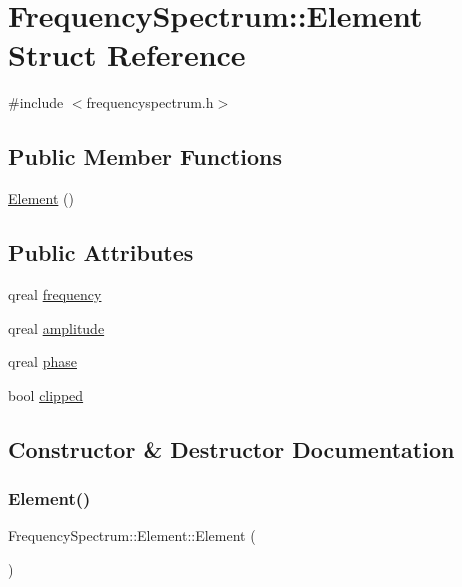 \hypertarget{struct_frequency_spectrum_1_1_element}{}\section{Frequency\+Spectrum\+:\+:Element Struct Reference}
\label{struct_frequency_spectrum_1_1_element}


{\ttfamily \#include $<$frequencyspectrum.\+h$>$}

\subsection*{Public Member Functions}
\begin{DoxyCompactItemize}
\item 
\hyperlink{struct_frequency_spectrum_1_1_element_a60e974e83dfd98518339e2681d8cdcdc}{Element} ()
\end{DoxyCompactItemize}
\subsection*{Public Attributes}
\begin{DoxyCompactItemize}
\item 
qreal \hyperlink{struct_frequency_spectrum_1_1_element_af6fb6c8a356fc27881bca9af0b89d88f}{frequency}
\item 
qreal \hyperlink{struct_frequency_spectrum_1_1_element_a057906284c20696169f327cae2f9ca80}{amplitude}
\item 
qreal \hyperlink{struct_frequency_spectrum_1_1_element_aea3fc976c7f3ba3d916d8017d847b011}{phase}
\item 
bool \hyperlink{struct_frequency_spectrum_1_1_element_a686d40af2870a06fba032c480573792a}{clipped}
\end{DoxyCompactItemize}


\subsection{Constructor \& Destructor Documentation}
\hypertarget{struct_frequency_spectrum_1_1_element_a60e974e83dfd98518339e2681d8cdcdc}{}\label{struct_frequency_spectrum_1_1_element_a60e974e83dfd98518339e2681d8cdcdc} 
\subsubsection{\texorpdfstring{Element()}{Element()}}
{\footnotesize\ttfamily Frequency\+Spectrum\+::\+Element\+::\+Element (\begin{DoxyParamCaption}{ }\end{DoxyParamCaption})\hspace{0.3cm}{\ttfamily [inline]}}



